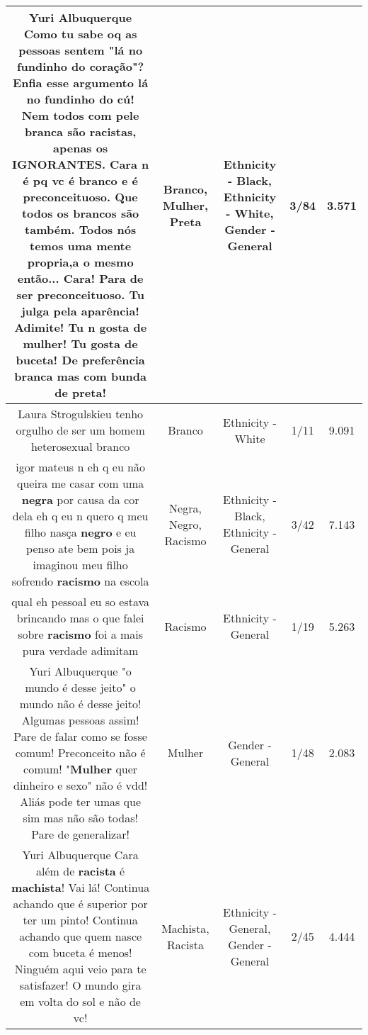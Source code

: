 \documentclass[11pt]{article}
\newlength\mylength
\begin{document}
\begin{center}
\begin{longtable}{|C{.65\mylength}|C{.30\mylength}|C{.12\mylength}|C{.12\mylength}|C{.12\mylength}|}
  \small Yuri Albuquerque Como tu sabe oq as pessoas sentem "lá no fundinho do coração"? Enfia esse argumento lá no fundinho do cú! Nem todos com pele branca são racistas, apenas os  IGNORANTES. Cara n é pq vc é \textbf{branco} e é preconceituoso. Que todos os brancos são também. Todos nós temos uma mente propria,a o mesmo então...  Cara! Para de ser preconceituoso. Tu julga pela aparência! Adimite! Tu n gosta de \textbf{mulher}! Tu gosta de buceta! De preferência branca mas com bunda de \textbf{preta}!\normalsize   & Branco, Mulher, Preta & Ethnicity - Black, Ethnicity - White, Gender - General & 3/84 & 3.571 \\  \hline
  \small Laura Strogulskieu tenho orgulho de ser um homem heterosexual branco\normalsize   & Branco & Ethnicity - White & 1/11 & 9.091 \\  \hline
  \small igor mateus n eh q eu não queira me casar com uma \textbf{negra} por causa da cor dela eh q eu n quero q meu filho nasça \textbf{negro} e eu penso ate bem pois ja imaginou meu filho sofrendo \textbf{racismo} na escola\normalsize   & Negra, Negro, Racismo & Ethnicity - Black, Ethnicity - General & 3/42 & 7.143 \\  \hline
  \small qual eh pessoal eu so estava brincando mas o que falei sobre \textbf{racismo} foi a mais pura verdade adimitam\normalsize   & Racismo & Ethnicity - General & 1/19 & 5.263 \\  \hline
  \small Yuri Albuquerque "o mundo é desse jeito" o mundo não é desse jeito! Algumas pessoas assim! Pare de falar como se fosse comum! Preconceito não é comum! "\textbf{Mulher} quer dinheiro e sexo" não é vdd! Aliás pode ter umas que sim mas não são todas! Pare de generalizar!\normalsize   & Mulher & Gender - General & 1/48 & 2.083 \\  \hline
  \small Yuri Albuquerque Cara além de \textbf{racista} é \textbf{machista}! Vai lá! Continua achando que é superior por ter um pinto! Continua achando que quem nasce com buceta é menos! Ninguém aqui veio para te satisfazer! O mundo gira em volta do sol e não de vc!\normalsize   & Machista, Racista & Ethnicity - General, Gender - General & 2/45 & 4.444 \\  \hline

\end{longtable}
\end{center}
\end{document}
